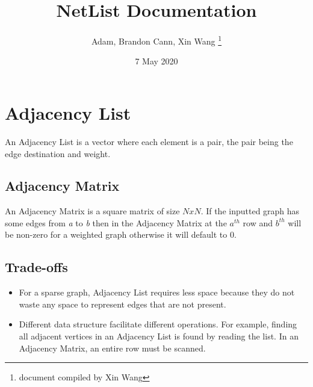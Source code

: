 \documentclass[a4paper, titlepage]{article}
\title{NetList Documentation}
\author{Adam, Brandon Cann, Xin Wang \thanks{document compiled by Xin Wang}}
\date{7 May 2020}
\begin{document}
    \section{Adjacency List}
    An Adjacency List is a vector where each element is a pair, the pair being the edge destination and weight.

    \subsection{Adjacency Matrix}
    An Adjacency Matrix is a square matrix of size $N x N$. If the inputted graph has some edges from \textit{a} to \textit{b} then
    in the Adjacency Matrix at the $a^{th}$ row and $b^{th}$ will be non-zero for a weighted graph otherwise it will default to 0.

    \subsection{Trade-offs}
    \begin{itemize}
        \item For a sparse graph, Adjacency List requires less space because they do not waste any space to represent edges that are not present.
        \item Different data structure facilitate different operations. For example, finding all adjacent vertices in an Adjacency List is 
        found by reading the list. In an Adjacency Matrix, an entire row must be scanned.
    \end{itemize}
\end{document}
